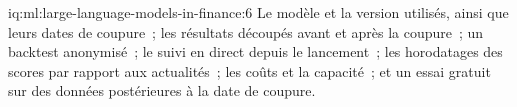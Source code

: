 \begin{solution}{iq:ml:large-language-models-in-finance:6}
Le modèle et la version utilisés, ainsi que leurs dates de coupure~; les résultats découpés avant et après la coupure~; un backtest anonymisé~; le
suivi en direct depuis le lancement~; les horodatages des scores par rapport aux actualités~; les coûts et la capacité~; et un essai gratuit
sur des données postérieures à la date de coupure.
\end{solution}

